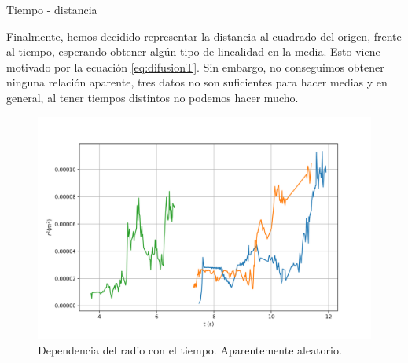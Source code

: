 \documentclass{beamer}
\begin{document}
\begin{frame}{Tiempo - distancia}

Finalmente, hemos decidido representar la distancia al cuadrado del origen, frente al tiempo, esperando obtener algún tipo de linealidad en la media. Esto viene motivado por la ecuación \ref{eq:difusionT}. Sin embargo, no conseguimos obtener ninguna relación aparente, tres datos no son suficientes para hacer medias y en general, al tener tiempos distintos no podemos hacer mucho.

\begin{figure}[h!]
\begin{center}
\includegraphics[scale=0.27]{Radios.png}
\caption{Dependencia del radio con el tiempo. Aparentemente aleatorio.}
\end{center}
\end{figure}
\end{frame}
\end{document}
